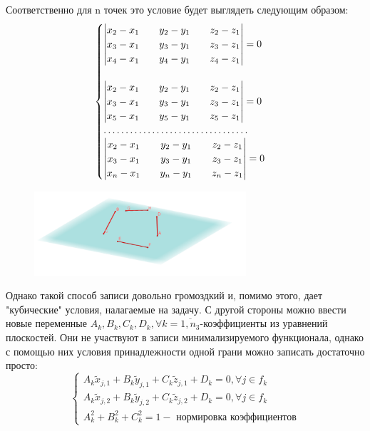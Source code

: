 \documentclass[14pt,fleqn,a4paper]{scrartcl}
\begin{document}
Соответственно для n точек это условие будет выглядеть следующим образом:
$$
\begin{cases}
\begin{vmatrix}
x_2-x_1 && y_2-y_1&& z_2-z_1 \\
x_3-x_1 && y_3-y_1&& z_3-z_1 \\
x_4-x_1 && y_4-y_1&& z_4-z_1 \\ 
\end{vmatrix}=0 \\
\newline \\
\begin{vmatrix}
x_2-x_1 && y_2-y_1&& z_2-z_1 \\
x_3-x_1 && y_3-y_1&& z_3-z_1 \\
x_5-x_1 && y_5-y_1&& z_5-z_1 \\ 
\end{vmatrix}=0 \\
\hdots \hdots \hdots \hdots \hdots \hdots \hdots \hdots \hdots \hdots \hdots \\ 
\begin{vmatrix}
x_2-x_1 && y_2-y_1&& z_2-z_1 \\
x_3-x_1 && y_3-y_1&& z_3-z_1 \\
x_n-x_1 && y_n-y_1&& z_n-z_1 \\ 
\end{vmatrix}=0 \\
\end{cases}
$$
\begin{figure}
\centering
\includegraphics[width=0.7\textwidth]{inoneplane.png}
\end{figure}
Однако такой способ записи довольно громоздкий и, помимо этого, дает "кубические" условия, налагаемые на задачу. С другой стороны можно ввести новые переменные $A_{k},B_{k},C_{k},D_{k}, \forall k=\overline{1,n_{3}}$-коэффициенты из уравнений плоскостей. Они не участвуют в записи минимализируемого функционала, однако с помощью них условия принадлежности одной грани можно записать достаточно просто:
$$
\begin{cases}
A_{k}\tilde{x}_{j,1}+B_{k}\tilde{y}_{j,1}+C_{k}\tilde{z}_{j,1}+D_{k}=0, \forall j \in f_{k} 
\\ 
A_{k}\tilde{x}_{j,2}+B_{k}\tilde{y}_{j,2}+C_{k}\tilde{z}_{j,2}+D_{k}=0, \forall j \in f_{k}
\\
A_{k}^{2}+B_{k}^{2}+C_{k}^{2}=1-\text{ нормировка коэффициентов}
\end{cases}
$$
\end{document}
